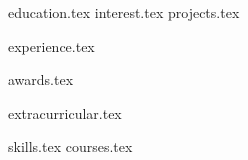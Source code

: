 \documentclass[letterpaper,11pt]{article}
\begin{document}


{education.tex}
{interest.tex}
{projects.tex}

{experience.tex}

{awards.tex}


{extracurricular.tex}

\sidebyside
    {{skills.tex}}
    {{courses.tex}}
\end{document}
